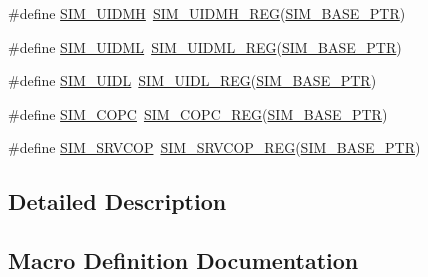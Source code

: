 \begin{DoxyCompactItemize}
\item 
\#define \hyperlink{group___s_i_m___register___accessor___macros_ga249d788e4d47b27bc148724e45a3f220}{S\+I\+M\+\_\+\+U\+I\+D\+MH}~\hyperlink{group___s_i_m___register___accessor___macros_ga1f5eac1bbac9b6798958b4697632ef21}{S\+I\+M\+\_\+\+U\+I\+D\+M\+H\+\_\+\+R\+EG}(\hyperlink{group___s_i_m___peripheral_ga719ec5df95fbb5732438f794f2cccf3c}{S\+I\+M\+\_\+\+B\+A\+S\+E\+\_\+\+P\+TR})
\item 
\#define \hyperlink{group___s_i_m___register___accessor___macros_gafcfbcc294236ebd497bbc60dc8b7989b}{S\+I\+M\+\_\+\+U\+I\+D\+ML}~\hyperlink{group___s_i_m___register___accessor___macros_ga7c4e741241b9fc954f2cd568d29b6b45}{S\+I\+M\+\_\+\+U\+I\+D\+M\+L\+\_\+\+R\+EG}(\hyperlink{group___s_i_m___peripheral_ga719ec5df95fbb5732438f794f2cccf3c}{S\+I\+M\+\_\+\+B\+A\+S\+E\+\_\+\+P\+TR})
\item 
\#define \hyperlink{group___s_i_m___register___accessor___macros_ga70ca9df0243083e9ba6b7b037beaa69d}{S\+I\+M\+\_\+\+U\+I\+DL}~\hyperlink{group___s_i_m___register___accessor___macros_gac4adca94e35e9cb122f6e0f80510708f}{S\+I\+M\+\_\+\+U\+I\+D\+L\+\_\+\+R\+EG}(\hyperlink{group___s_i_m___peripheral_ga719ec5df95fbb5732438f794f2cccf3c}{S\+I\+M\+\_\+\+B\+A\+S\+E\+\_\+\+P\+TR})
\item 
\#define \hyperlink{group___s_i_m___register___accessor___macros_gaa93ea724cc50ba69565f9d38d46e2cea}{S\+I\+M\+\_\+\+C\+O\+PC}~\hyperlink{group___s_i_m___register___accessor___macros_ga24b7bb2caf49ac6a5bea962ae761d371}{S\+I\+M\+\_\+\+C\+O\+P\+C\+\_\+\+R\+EG}(\hyperlink{group___s_i_m___peripheral_ga719ec5df95fbb5732438f794f2cccf3c}{S\+I\+M\+\_\+\+B\+A\+S\+E\+\_\+\+P\+TR})
\item 
\#define \hyperlink{group___s_i_m___register___accessor___macros_ga31a4e51e0655268b6aa618acf0bd1ef4}{S\+I\+M\+\_\+\+S\+R\+V\+C\+OP}~\hyperlink{group___s_i_m___register___accessor___macros_gaf4814908256050a2818ca29f249545c2}{S\+I\+M\+\_\+\+S\+R\+V\+C\+O\+P\+\_\+\+R\+EG}(\hyperlink{group___s_i_m___peripheral_ga719ec5df95fbb5732438f794f2cccf3c}{S\+I\+M\+\_\+\+B\+A\+S\+E\+\_\+\+P\+TR})
\end{DoxyCompactItemize}


\subsection{Detailed Description}


\subsection{Macro Definition Documentation}
\mbox{\label{group___s_i_m___register___accessor___macros_ga86768069f4f95ba7e0155fc53c6cf665}} 
